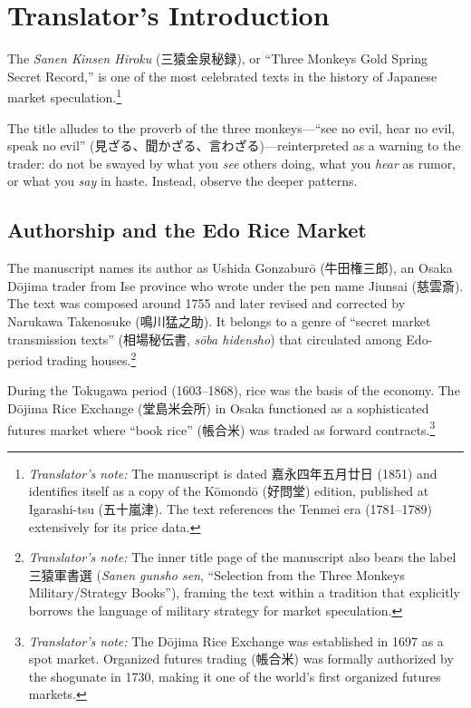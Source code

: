 \documentclass[10pt, openany]{book}
\newcommand{\jp}[1]{{\japanesefont #1}}
\newcommand{\tn}[1]{\footnote{\textit{Translator's note:} #1}}
\begin{document}
\thispagestyle{empty}
\tableofcontents
\newpage

\chapter*{Translator's Introduction}

The \textit{Sanen Kinsen Hiroku} (\jp{三猿金泉秘録}), or ``Three Monkeys
Gold Spring Secret Record,'' is one of the most celebrated texts in the
history of Japanese market speculation.\tn{The manuscript is dated
\jp{嘉永四年五月廿日} (1851) and identifies itself as a copy of the
K\=omond\=o (\jp{好問堂}) edition, published at Igarashi-tsu
(\jp{五十嵐津}). The text references the Tenmei era (1781--1789)
extensively for its price data.}

\begin{sloppypar}
The title alludes to the proverb of the three
monkeys---``see no evil, hear no evil, speak no evil''
(\jp{見ざる、聞かざる、言わざる})---reinterpreted
as a warning to the trader: do not be swayed by what you \textit{see} others
doing, what you \textit{hear} as rumor, or what you \textit{say} in haste.
Instead, observe the deeper patterns.
\end{sloppypar}

\section*{Authorship and the Edo Rice Market}

The manuscript names its author as Ushida Gonzabur\=o (\jp{牛田権三郎}),
an Osaka D\=ojima trader from Ise province who wrote under the pen name
Jiunsai (\jp{慈雲斎}). The text was composed around 1755 and later
revised and corrected by Narukawa Takenosuke (\jp{鳴川猛之助}). It
belongs to a genre of ``secret market transmission texts''
(\jp{相場秘伝書}, \textit{s\=oba hidensho}) that circulated among
Edo-period trading houses.\tn{The inner title page of the manuscript
also bears the label \jp{三猿軍書選} (\textit{Sanen gunsho sen},
``Selection from the Three Monkeys Military/Strategy Books''), framing
the text within a tradition that explicitly borrows the language of
military strategy for market speculation.}

During the Tokugawa period (1603--1868), rice was the basis of the economy.
The D\=ojima Rice Exchange (\jp{堂島米会所}) in Osaka functioned as a
sophisticated futures market where ``book rice'' (\jp{帳合米}) was traded
as forward contracts.\tn{The D\=ojima Rice Exchange was established in 1697
as a spot market. Organized futures trading (\jp{帳合米}) was formally
authorized by the shogunate in 1730, making it one of the world's first
organized futures markets.}
\end{document}

